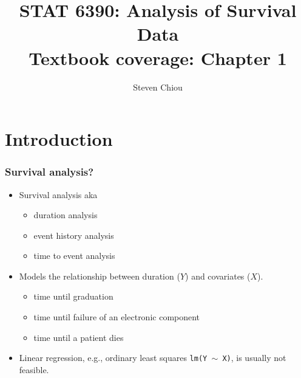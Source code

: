 \documentclass[10pt]{beamer}\usepackage[]{graphicx}\usepackage[]{color}
\title[STAT 6390]{STAT 6390: Analysis of Survival Data\\
  \small{Textbook coverage: Chapter 1}\\}
\author[Steven Chiou]{Steven Chiou}
\institute[UTD]{Department of Mathematical Sciences, \\ University of Texas at Dallas}
\date{}
\begin{document}
\begin{frame}[fragile]
  \titlepage

\end{frame}

\bgroup
{}

\section{Introduction}
\begin{frame}
  \frametitle{Survival analysis?}
  \begin{itemize}
  \item Survival analysis aka
    \begin{itemize}
    \item duration analysis
    \item event history analysis
    \item time to event analysis
    \end{itemize}
  \item Models the relationship between duration ($Y$) and covariates ($X$).
    \begin{itemize}
    \item time until graduation
    \item time until failure of  an electronic component
    \item time until a patient dies
    \end{itemize}
  \item Linear regression, e.g., ordinary least squares \texttt{lm(Y $\sim$ X)}, is usually not feasible.
  \end{itemize}
\end{frame}
\end{document}
